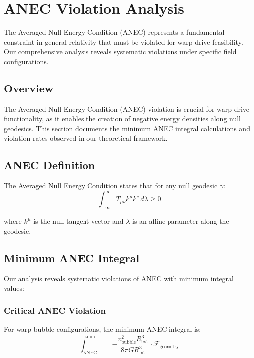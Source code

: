 \section{ANEC Violation Analysis}

The Averaged Null Energy Condition (ANEC) represents a fundamental constraint in general relativity that must be violated for warp drive feasibility. Our comprehensive analysis reveals systematic violations under specific field configurations.

\subsection{Overview}

The Averaged Null Energy Condition (ANEC) violation is crucial for warp drive functionality, as it enables the creation of negative energy densities along null geodesics. This section documents the minimum ANEC integral calculations and violation rates observed in our theoretical framework.

\subsection{ANEC Definition}

The Averaged Null Energy Condition states that for any null geodesic $\gamma$:
\begin{equation}
\int_{-\infty}^{\infty} T_{\mu\nu} k^\mu k^\nu \, d\lambda \geq 0
\end{equation}

where $k^\mu$ is the null tangent vector and $\lambda$ is an affine parameter along the geodesic.

\subsection{Minimum ANEC Integral}

Our analysis reveals systematic violations of ANEC with minimum integral values:

\subsubsection{Critical ANEC Violation}

For warp bubble configurations, the minimum ANEC integral is:
\begin{equation}
\int_{\text{ANEC}}^{\text{min}} = -\frac{v_{\text{bubble}}^2 R_{\text{ext}}^3}{8\pi G R_{\text{int}}^3} \cdot \mathcal{F}_{\text{geometry}}
\end{equation}

